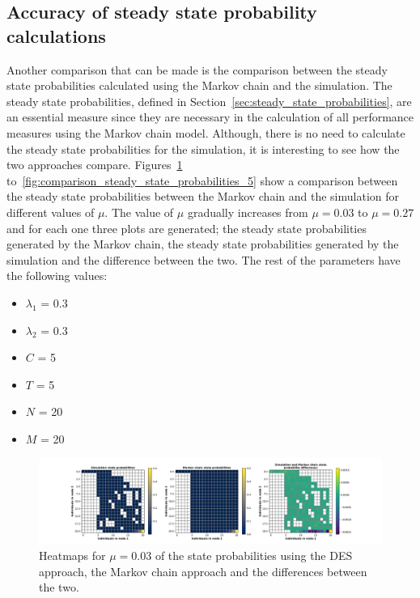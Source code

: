 \subsection{Accuracy of steady state probability calculations}

Another comparison that can be made is the comparison between the steady state
probabilities calculated using the Markov chain and the simulation.
The steady state probabilities, defined in
Section~\ref{sec:steady_state_probabilities}, are an essential measure since
they are necessary in the calculation of all performance measures using the
Markov chain model.
Although, there is no need to calculate the steady state probabilities for the
simulation, it is interesting to see how the two approaches compare.
Figures~\ref{fig:comparison_steady_state_probabilities_1}
to~\ref{fig:comparison_steady_state_probabilities_5} show a comparison between
the steady state probabilities between the Markov chain and the simulation
for different values of \(\mu\).
The value of \(\mu\) gradually increases from \(\mu = 0.03\) to \(\mu = 0.27\)
and for each one three plots are generated; the steady state probabilities
generated by the Markov chain, the steady state probabilities generated by the
simulation and the difference between the two.
The rest of the parameters have the following values:

\begin{multicols}{2}
    \begin{itemize}
        \item \(\lambda_1\) = 0.3
        \item \(\lambda_2\) = 0.3
        \item \(C\) = 5
        \item \(T\) = 5
        \item \(N\) = 20
        \item \(M\) = 20
    \end{itemize}
\end{multicols}


\begin{figure}[H]
    \includegraphics[width=\textwidth, trim=100 10 100 10, clip]{chapters/03_queueing_model/Bin/numeric_results_and_timings/steady_state_probabilities/main_1.pdf}
    \caption{Heatmaps for \(\mu = 0.03\) of the state probabilities using the
    DES approach, the Markov chain approach and the differences between the
    two.}
    \label{fig:comparison_steady_state_probabilities_1}
\end{figure}

